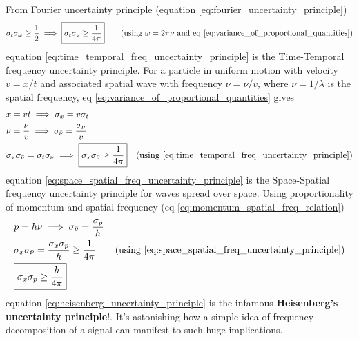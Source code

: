 \documentclass[11pt, a4paper]{article}
\newcommand{\eqrefnp}[1]{\textup{\ref{#1}}}  %
\newcommand{\stdev}[1]{\sigma_{#1}}
\begin{document}
	From Fourier uncertainty principle (equation \eqrefnp{eq:fourier_uncertainty_principle})
	\begin{equation}\label{eq:time_temporal_freq_uncertainty_principle}
		\stdev{t} \stdev{\omega} \geq \frac{1}{2} \implies \boxed{\stdev{t} \stdev{\nu} \geq \frac{1}{4\pi}} \qquad \text{(using $\omega = 2\pi \nu$ and eq \eqrefnp{eq:variance_of_proportional_quantities})}
	\end{equation}
	equation \eqref{eq:time_temporal_freq_uncertainty_principle} is the Time-Temporal frequency uncertainty principle. For a particle in uniform motion with velocity $v = x / t$ and associated spatial wave with frequency $\bar{\nu} = \nu / v$, where $\bar{\nu} = 1/\lambda$ is the spatial frequency, eq \eqref{eq:variance_of_proportional_quantities} gives
	\begin{align}
		& x = vt \implies \stdev{x} = v\stdev{t} \nonumber \\
		& \bar{\nu} = \frac{\nu}{v} \implies \stdev{\bar{\nu}} = \frac{\stdev{\nu}}{v} \nonumber \\
		& \stdev{x}\stdev{\bar{\nu}} = \stdev{t} \stdev{\nu} \implies \boxed{\stdev{x}\stdev{\bar{\nu}} \geq \frac{1}{4\pi}} \quad \text{(using \eqrefnp{eq:time_temporal_freq_uncertainty_principle})} \label{eq:space_spatial_freq_uncertainty_principle}
	\end{align}
	equation \eqref{eq:space_spatial_freq_uncertainty_principle} is the Space-Spatial frequency uncertainty principle for waves spread over space. Using proportionality of momentum and spatial frequency (eq \eqrefnp{eq:momentum_spatial_freq_relation})
	\begin{align}
		& p = h \bar{\nu} \implies \stdev{\bar{\nu}} = \frac{\stdev{p}}{h}  \nonumber \\
		& \stdev{x}\stdev{\bar{\nu}} = \frac{\stdev{x}\stdev{p}}{h} \geq \frac{1}{4 \pi} \nonumber \tag{using \eqrefnp{eq:space_spatial_freq_uncertainty_principle}} \\
		& \boxed{\stdev{x}\stdev{p} \geq \frac{h}{4 \pi}} \label{eq:heisenberg_uncertainty_principle}
	\end{align}
	equation \eqref{eq:heisenberg_uncertainty_principle} is the infamous \textbf{Heisenberg's uncertainty principle}!. It's astonishing how a simple idea of frequency decomposition of a signal can manifest to such huge implications.
	
\end{document}
